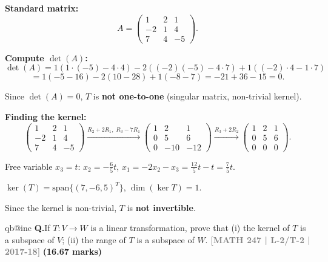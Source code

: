 \documentclass[12pt,a3paper]{article}
\makeatletter
\newcommand{\yr}[1]{\hfill\textcolor{gray}{\small\textbf{[#1]}}}
\newcommand{\mk}[1]{\textcolor{orange!70!black}{\small\textbf{(#1 marks)}}}
\newcounter{qnum}
\newcommand{\Q}[1]{%
  \csname qb@inc\endcsname
  \needspace{4\baselineskip}
  \refstepcounter{qnum}
  \vspace{6pt}
  \noindent\textbf{Q\theqnum.}\enspace #1\par
}
\makeatother
\begin{document}
\begin{tcolorbox}[enhanced,breakable,
  colback=cF!4,colframe=cF,boxrule=0.8pt,arc=5pt,
  title={\textbf{Answer --- $T:\mathbb{R}^3\to\mathbb{R}^3$ (given by $w_i$): One-to-One?}},
  fonttitle=\bfseries\color{white},colbacktitle=cF]

\textbf{Standard matrix:}
\[
A=\begin{pmatrix}1&2&1\\-2&1&4\\7&4&-5\end{pmatrix}.
\]

\textbf{Compute $\det(A)$:}
\[
\det(A)=1(1\cdot(-5)-4\cdot4)-2((-2)(-5)-4\cdot7)+1((-2)\cdot4-1\cdot7)
\]
\[
=1(-5-16)-2(10-28)+1(-8-7)
=-21+36-15=0.
\]

Since $\det(A)=0$, $T$ is \textbf{not one-to-one} (singular matrix, non-trivial kernel).

\textbf{Finding the kernel:}
\[
\begin{pmatrix}1&2&1\\-2&1&4\\7&4&-5\end{pmatrix}
\xrightarrow{R_2+2R_1,\;R_3-7R_1}
\begin{pmatrix}1&2&1\\0&5&6\\0&-10&-12\end{pmatrix}
\xrightarrow{R_3+2R_2}
\begin{pmatrix}1&2&1\\0&5&6\\0&0&0\end{pmatrix}.
\]

Free variable $x_3=t$: $x_2=-\tfrac{6}{5}t$, $x_1=-2x_2-x_3=\tfrac{12}{5}t-t=\tfrac{7}{5}t$.

$\ker(T)=\mathrm{span}\{(7,-6,5)^T\}$, $\dim(\ker T)=1$.

Since the kernel is non-trivial, $T$ is \textbf{not invertible}.

\end{tcolorbox}

\Q{If $T: V \to W$ is a linear transformation, prove that (i) the kernel of $T$ is a subspace of $V$; (ii) the range of $T$ is a subspace of $W$.
\yr{MATH 247 | L-2/T-2 | 2017-18} \mk{16.67}}
\end{document}
